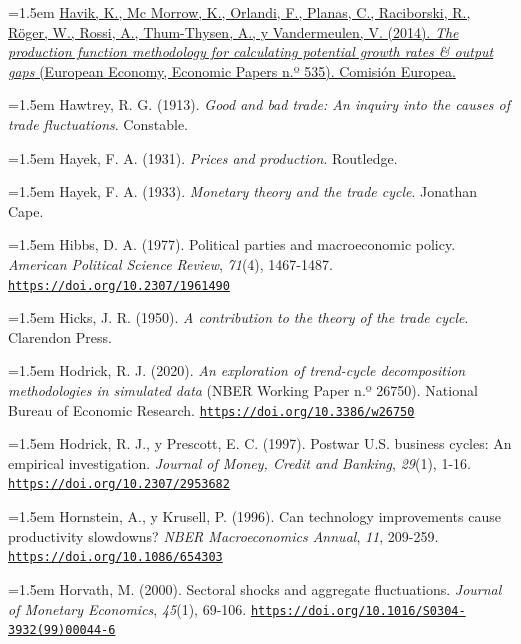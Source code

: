 \documentclass[10pt,a4paper]{article}
\begin{document}
\noindent\hangindent=1.5em \href{https://ec.europa.eu/economy_finance/publications/economic_paper/2014/pdf/ecp535_en.pdf}{Havik, K., Mc Morrow, K., Orlandi, F., Planas, C., Raciborski, R., Röger, W., Rossi, A., Thum-Thysen, A., y Vandermeulen, V. (2014). \textit{The production function methodology for calculating potential growth rates \& output gaps} (European Economy, Economic Papers n.º 535). Comisión Europea.}

\noindent\hangindent=1.5em Hawtrey, R. G. (1913). \textit{Good and bad trade: An inquiry into the causes of trade fluctuations}. Constable.

\noindent\hangindent=1.5em Hayek, F. A. (1931). \textit{Prices and production}. Routledge.

\noindent\hangindent=1.5em Hayek, F. A. (1933). \textit{Monetary theory and the trade cycle}. Jonathan Cape.

\noindent\hangindent=1.5em Hibbs, D. A. (1977). Political parties and macroeconomic policy. \textit{American Political Science Review}, \textit{71}(4), 1467-1487. \href{https://doi.org/10.2307/1961490}{\nolinkurl{https://doi.org/10.2307/1961490}}

\noindent\hangindent=1.5em Hicks, J. R. (1950). \textit{A contribution to the theory of the trade cycle}. Clarendon Press.

\noindent\hangindent=1.5em Hodrick, R. J. (2020). \textit{An exploration of trend-cycle decomposition methodologies in simulated data} (NBER Working Paper n.º 26750). National Bureau of Economic Research. \href{https://doi.org/10.3386/w26750}{\nolinkurl{https://doi.org/10.3386/w26750}}

\noindent\hangindent=1.5em Hodrick, R. J., y Prescott, E. C. (1997). Postwar U.S. business cycles: An empirical investigation. \textit{Journal of Money, Credit and Banking}, \textit{29}(1), 1-16. \href{https://doi.org/10.2307/2953682}{\nolinkurl{https://doi.org/10.2307/2953682}}

\noindent\hangindent=1.5em Hornstein, A., y Krusell, P. (1996). Can technology improvements cause productivity slowdowns? \textit{NBER Macroeconomics Annual}, \textit{11}, 209-259. \href{https://doi.org/10.1086/654303}{\nolinkurl{https://doi.org/10.1086/654303}}

\noindent\hangindent=1.5em Horvath, M. (2000). Sectoral shocks and aggregate fluctuations. \textit{Journal of Monetary Economics}, \textit{45}(1), 69-106. \href{https://doi.org/10.1016/S0304-3932(99)00044-6}{\nolinkurl{https://doi.org/10.1016/S0304-3932(99)00044-6}}
\end{document}

